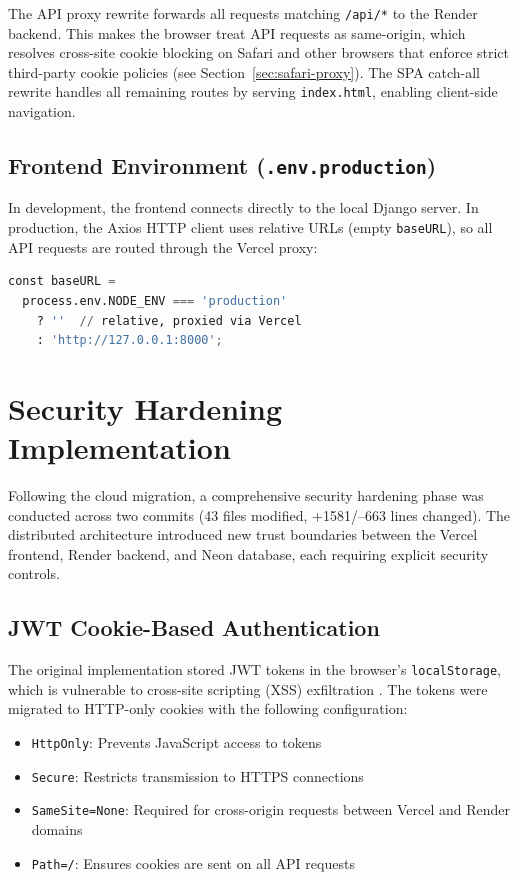 \documentclass[conference]{IEEEtran}
\begin{document}
The API proxy rewrite forwards all requests matching \texttt{/api/*} to the Render backend. This makes the browser treat API requests as same-origin, which resolves cross-site cookie blocking on Safari and other browsers that enforce strict third-party cookie policies (see Section~\ref{sec:safari-proxy}). The SPA catch-all rewrite handles all remaining routes by serving \texttt{index.html}, enabling client-side navigation.

\subsection{Frontend Environment (\texttt{.env.production})}
\label{sec:frontendenv}

In development, the frontend connects directly to the local Django server. In production, the Axios HTTP client uses relative URLs (empty \texttt{baseURL}), so all API requests are routed through the Vercel proxy:

\begin{lstlisting}[language=Python, caption={Axios base URL selection (axiosConfig.js)}]
const baseURL =
  process.env.NODE_ENV === 'production'
    ? ''  // relative, proxied via Vercel
    : 'http://127.0.0.1:8000';
\end{lstlisting}

\section{Security Hardening Implementation}
\label{sec:security-hardening}

Following the cloud migration, a comprehensive security hardening phase was conducted across two commits (43 files modified, +1581/--663 lines changed). The distributed architecture introduced new trust boundaries between the Vercel frontend, Render backend, and Neon database, each requiring explicit security controls.

\subsection{JWT Cookie-Based Authentication}

The original implementation stored JWT tokens in the browser's \texttt{localStorage}, which is vulnerable to cross-site scripting (XSS) exfiltration \cite{b10}. The tokens were migrated to HTTP-only cookies with the following configuration:

\begin{itemize}
    \item \texttt{HttpOnly}: Prevents JavaScript access to tokens
    \item \texttt{Secure}: Restricts transmission to HTTPS connections
    \item \texttt{SameSite=None}: Required for cross-origin requests between Vercel and Render domains
    \item \texttt{Path=/}: Ensures cookies are sent on all API requests
\end{itemize}
\end{document}
